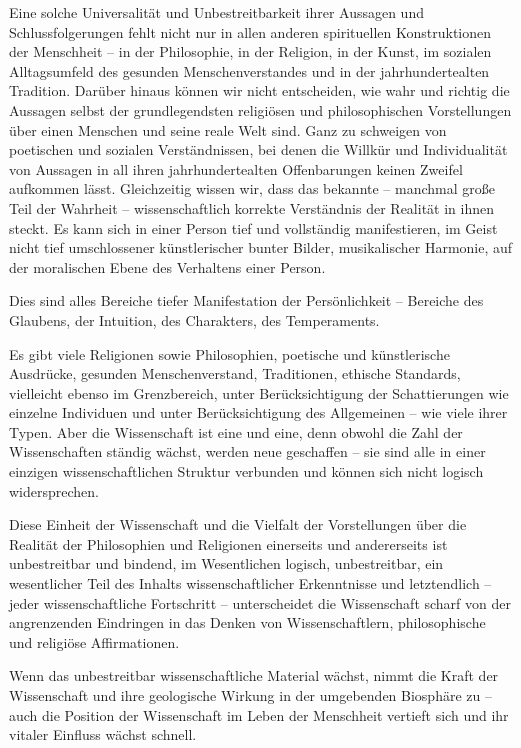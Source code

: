 \documentclass[11pt,a4paper]{book}
\begin{document}
Eine solche Universalität und Unbestreitbarkeit ihrer Aussagen und Schlussfolgerungen fehlt nicht nur in allen anderen spirituellen Konstruktionen der Menschheit -- in der Philosophie, in der Religion, in der Kunst, im sozialen Alltagsumfeld des gesunden Menschenverstandes und in der jahrhundertealten Tradition. Darüber hinaus können wir nicht entscheiden, wie wahr und richtig die Aussagen selbst der grundlegendsten religiösen und philosophischen Vorstellungen über einen Menschen und seine reale Welt sind. Ganz zu schweigen von poetischen und sozialen Verständnissen, bei denen die Willkür und Individualität von Aussagen in all ihren jahrhundertealten Offenbarungen keinen Zweifel aufkommen lässt. Gleichzeitig wissen wir, dass das bekannte -- manchmal große Teil der Wahrheit -- wissenschaftlich korrekte Verständnis der Realität in ihnen steckt. Es kann sich in einer Person tief und vollständig manifestieren, im Geist nicht tief umschlossener künstlerischer bunter Bilder, musikalischer Harmonie, auf der moralischen Ebene des Verhaltens einer Person.



Dies sind alles Bereiche tiefer Manifestation der Persönlichkeit -- Bereiche des Glaubens, der Intuition, des Charakters, des Temperaments.



Es gibt viele Religionen sowie Philosophien, poetische und künstlerische Ausdrücke, gesunden Menschenverstand, Traditionen, ethische Standards, vielleicht ebenso im Grenzbereich, unter Berücksichtigung der Schattierungen wie einzelne Individuen und unter Berücksichtigung des Allgemeinen -- wie viele ihrer Typen. Aber die Wissenschaft ist eine und eine, denn obwohl die Zahl der Wissenschaften ständig wächst, werden neue geschaffen -- sie sind alle in einer einzigen wissenschaftlichen Struktur verbunden und können sich nicht logisch widersprechen.



Diese Einheit der Wissenschaft und die Vielfalt der Vorstellungen über die Realität der Philosophien und Religionen einerseits und andererseits ist unbestreitbar und bindend, im Wesentlichen logisch, unbestreitbar, ein wesentlicher Teil des Inhalts wissenschaftlicher Erkenntnisse und letztendlich -- jeder wissenschaftliche Fortschritt -- unterscheidet die Wissenschaft scharf von der angrenzenden Eindringen in das Denken von Wissenschaftlern, philosophische und religiöse Affirmationen.



Wenn das unbestreitbar wissenschaftliche Material wächst, nimmt die Kraft der Wissenschaft und ihre geologische Wirkung in der umgebenden Biosphäre zu -- auch die Position der Wissenschaft im Leben der Menschheit vertieft sich und ihr vitaler Einfluss wächst schnell.
\end{document}

